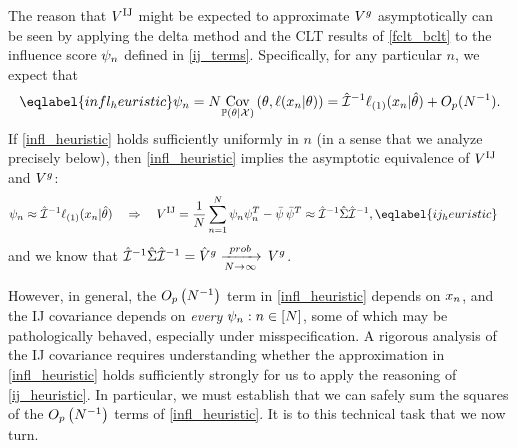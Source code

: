 
The reason that $V^{\mathrm{IJ}}$ might be expected to approximate $V^g$
asymptotically can be seen by applying the delta method and the
CLT results of \eqref{fclt_bclt} to the
influence score $\psi_n$ defined in \eqref{ij_terms}.  Specifically,
for any particular $n$, we expect that
%
\begin{align}\eqlabel{infl_heuristic}
    \infl_n = N \cov{\post}{\theta, \ell(\x_n \vert \theta)} =
    \infohat^{-1} \ellgrad{1}(\x_n \vert \thetahat) + O_p(N^{-1}).
\end{align}
%
If \eqref{infl_heuristic} holds sufficiently uniformly in $n$
(in a sense that we analyze precisely below), then \eqref{infl_heuristic}
implies the asymptotic equivalence of $V^{\mathrm{IJ}}$ and $V^g$:
%
\begin{align}
%
\infl_n \approx{}& \infohat^{-1} \ellgrad{1}(\x_n \vert \thetahat)
\quad\Rightarrow\quad
\gcovij ={} \meann \infl_n \infl_n^T - \bar{\infl} \, \bar{\infl}^T
\approx{} \infohat^{-1} \scorecovhat \infohat^{-1}, \eqlabel{ij_heuristic}
%
\end{align}
%
and we know that $\hat{\mathcal{I}}^{-1} \hat\Sigma \hat{\mathcal{I}}^{-1} = \hat{V}^{g} \xrightarrow[N\rightarrow\infty]{prob}\,
V^g$.


However, in general, the $O_p\left(N^{-1}\right)$ term in \eqref{infl_heuristic}
depends on $x_n$, and the IJ covariance depends on {\em every} $\psi_n: n \in
[N]$, some of which may be pathologically behaved, especially under
misspecification.
%
A rigorous analysis of the IJ covariance requires
understanding whether the approximation in \eqref{infl_heuristic} holds
sufficiently strongly for us to apply the reasoning of \eqref{ij_heuristic}.
In particular, we must establish that we can safely sum the squares of the $O_p\left(N^{-1}\right)$
terms of \eqref{infl_heuristic}.  It is to this technical task that we
now turn.



